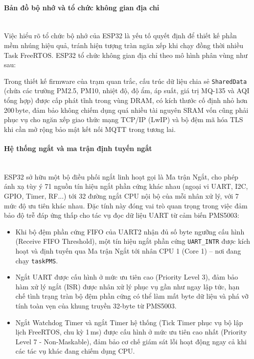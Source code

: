 \documentclass[12pt,a4paper]{article}
\begin{document}
\paragraph{Bản đồ bộ nhớ và tổ chức không gian địa chỉ}\mbox{}\\

Việc hiểu rõ tổ chức bộ nhớ của ESP32 là yếu tố quyết định để thiết kế phần mềm nhúng hiệu quả, tránh hiện tượng tràn ngăn xếp khi chạy đồng thời nhiều Task FreeRTOS. ESP32 tổ chức không gian địa chỉ theo mô hình phân vùng như sau:

\begin{table}[H]
\centering\small
\caption{Bản đồ bộ nhớ của vi xử lý ESP32}
\label{tab:esp32_memmap}

\end{table}

Trong thiết kế firmware của trạm quan trắc, cấu trúc dữ liệu chia sẻ \texttt{SharedData} (chứa các trường PM2.5, PM10, nhiệt độ, độ ẩm, áp suất, giá trị MQ-135 và AQI tổng hợp) được cấp phát tĩnh trong vùng DRAM, có kích thước cố định nhỏ hơn 200\,byte, đảm bảo không chiếm dụng quá nhiều tài nguyên SRAM vốn cũng phải phục vụ cho ngăn xếp giao thức mạng TCP/IP (LwIP) và bộ đệm mã hóa TLS khi cần mở rộng bảo mật kết nối MQTT trong tương lai.

\paragraph{Hệ thống ngắt và ma trận định tuyến ngắt}\mbox{}\\

ESP32 sở hữu một bộ điều phối ngắt linh hoạt gọi là Ma trận Ngắt, cho phép ánh xạ tùy ý 71 nguồn tín hiệu ngắt phần cứng khác nhau (ngoại vi UART, I2C, GPIO, Timer, RF...) tới 32 đường ngắt CPU nội bộ của mỗi nhân xử lý, với 7 mức độ ưu tiên khác nhau. Đặc tính này đóng vai trò quan trọng trong việc đảm bảo độ trễ đáp ứng thấp cho tác vụ đọc dữ liệu UART từ cảm biến PMS5003:

\begin{itemize}
    \item Khi bộ đệm phần cứng FIFO của UART2 nhận đủ số byte ngưỡng cấu hình (Receive FIFO Threshold), một tín hiệu ngắt phần cứng \texttt{UART\_INTR} được kích hoạt và định tuyến qua Ma trận Ngắt tới nhân CPU 1 (Core 1) -- nơi đang chạy \texttt{taskPMS}.
    \item Ngắt UART được cấu hình ở mức ưu tiên cao (Priority Level 3), đảm bảo hàm xử lý ngắt (ISR) được nhân xử lý phục vụ gần như ngay lập tức, hạn chế tình trạng tràn bộ đệm phần cứng có thể làm mất byte dữ liệu và phá vỡ tính toàn vẹn của khung truyền 32-byte từ PMS5003.
    \item Ngắt Watchdog Timer và ngắt Timer hệ thống (Tick Timer phục vụ bộ lập lịch FreeRTOS, chu kỳ 1\,ms) được cấu hình ở mức ưu tiên cao nhất (Priority Level 7 - Non-Maskable), đảm bảo cơ chế giám sát lỗi hoạt động ngay cả khi các tác vụ khác đang chiếm dụng CPU.
\end{itemize}
\end{document}
